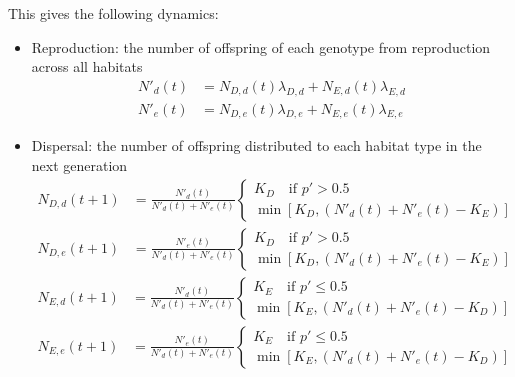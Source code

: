 \documentclass[11pt, reqno]{amsart}
\begin{document}
This gives the following dynamics: 
\begin{itemize}
\item Reproduction: the number of offspring of each genotype from reproduction across all habitats
  \begin{subequations}\label{E:repro}
    \begin{align}
      N'_d(t) &= N_{D,d}(t)\lambda_{D,d}+ N_{E,d}(t)\lambda_{E,d}\\
      N'_e(t) &= N_{D,e}(t)\lambda_{D,e}+ N_{E,e}(t)\lambda_{E,e}
      \end{align}
  \end{subequations}
\item Dispersal: the number of offspring distributed to each habitat type in the next generation
  \begin{subequations}\label{E:Ddisp}
    \begin{align}
      N_{D,d}(t+1)&= \frac{ N'_d(t)}{N'_d(t)+N'_e(t)}\begin{cases}K_D \quad \textrm{if } p' > 0.5\\ \min \left[K_D, (N'_d(t)+N'_e(t)-K_E)\right]\end{cases}\\
      N_{D,e}(t+1)&= \frac{ N'_e(t)}{N'_d(t)+N'_e(t)}\begin{cases}K_D \quad \textrm{if } p' > 0.5\\ \min \left[K_D, (N'_d(t)+N'_e(t)-K_E)\right]\end{cases}
     \end{align}
\end{subequations}
  \begin{subequations}\label{E:Edisp}
    \begin{align}
      N_{E,d}(t+1)&= \frac{ N'_d(t)}{N'_d(t)+N'_e(t)}\begin{cases}K_E \quad \textrm{if } p' \le 0.5\\ \min \left[K_E, (N'_d(t)+N'_e(t)-K_D)\right]\end{cases}\\
      N_{E,e}(t+1)&= \frac{ N'_e(t)}{N'_d(t)+N'_e(t)}\begin{cases}K_E \quad \textrm{if } p' \le 0.5\\ \min \left[K_E, (N'_d(t)+N'_e(t)-K_D)\right]\end{cases}
    \end{align}
   \end{subequations}

\end{itemize}
\end{document}
